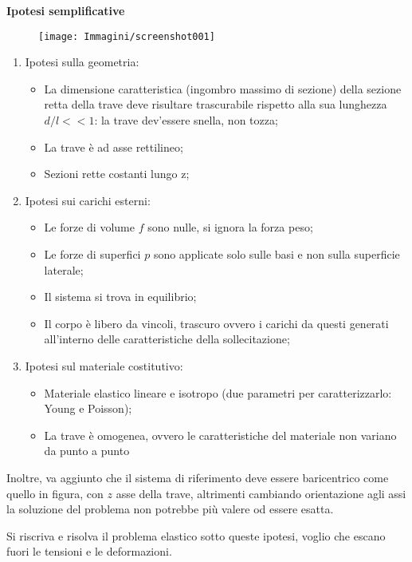 \documentclass{article}
\begin{document}
\begin{adjustwidth}{2in}{}
\textbf{{\Large Ipotesi semplificative}} \newline
\begin{figure}[H]
	\centering
	\texttt{[image: Immagini/screenshot001]}

	\label{fig:screenshot001}
\end{figure}
	\begin{enumerate}
	\item Ipotesi sulla geometria:
		\begin{itemize}		
		\item La dimensione caratteristica (ingombro massimo di sezione) della sezione retta della trave
		deve risultare trascurabile rispetto alla sua lunghezza $ d/l<<1 $: la trave dev'essere snella, non tozza;
		\item La trave è ad asse rettilineo;
		\item Sezioni rette costanti lungo z;
		\end{itemize}
\newpage
	\item Ipotesi sui carichi esterni:
		\begin{itemize}
			\item  Le forze di volume $ f $ sono nulle, si ignora la forza peso;
		\item Le forze di superfici	$ p $ sono applicate solo sulle basi e non sulla superficie laterale;
		\item Il sistema si trova in equilibrio;
		\item Il corpo è libero da vincoli, trascuro ovvero i carichi da questi generati all'interno delle caratteristiche della sollecitazione;
		\end{itemize}
	\item Ipotesi sul materiale costitutivo:
		\begin{itemize}
			\item Materiale elastico lineare e isotropo (due parametri per caratterizzarlo: Young e Poisson);
		\item La trave è omogenea, ovvero le caratteristiche del	materiale non variano da punto a punto
		\end{itemize}
	\end{enumerate}
	Inoltre, va aggiunto che il sistema di riferimento deve essere baricentrico come quello in figura, con $z$ asse della trave, altrimenti cambiando orientazione agli assi la soluzione del problema non potrebbe più valere od essere esatta. \newline 
	
	Si riscriva e risolva il problema elastico sotto queste ipotesi, voglio che escano fuori le tensioni e le deformazioni. \newline
	

\end{adjustwidth}
\end{document}
